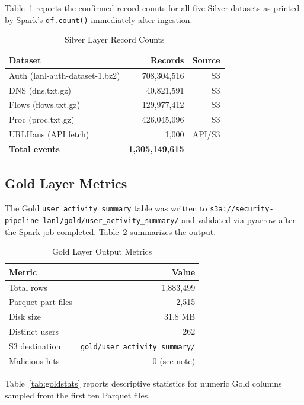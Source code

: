 \documentclass[conference]{IEEEtran}
\begin{document}
Table~\ref{tab:silver} reports the confirmed record counts for all five Silver datasets as printed by Spark's \texttt{df.count()} immediately after ingestion.

\begin{table}[htbp]
\caption{Silver Layer Record Counts}
\label{tab:silver}
\centering
\begin{tabular}{lrr}
\toprule
\textbf{Dataset} & \textbf{Records} & \textbf{Source} \\
\midrule
Auth (lanl-auth-dataset-1.bz2) & 708,304,516 & S3 \\
DNS (dns.txt.gz) & 40,821,591 & S3 \\
Flows (flows.txt.gz) & 129,977,412 & S3 \\
Proc (proc.txt.gz) & 426,045,096 & S3 \\
URLHaus (API fetch) & 1,000 & API/S3 \\
\midrule
\textbf{Total events} & \textbf{1,305,149,615} & \\
\bottomrule
\end{tabular}
\end{table}

\subsection{Gold Layer Metrics}

The Gold \texttt{user\_activity\_summary} table was written to \texttt{s3a://security-pipeline-lanl/gold/user\_activity\_summary/} and validated via pyarrow after the Spark job completed. Table~\ref{tab:gold} summarizes the output.

\begin{table}[htbp]
\caption{Gold Layer Output Metrics}
\label{tab:gold}
\centering
\begin{tabular}{lr}
\toprule
\textbf{Metric} & \textbf{Value} \\
\midrule
Total rows & 1,883,499 \\
Parquet part files & 2,515 \\
Disk size & 31.8 MB \\
Distinct users & 262 \\
S3 destination & \texttt{gold/user\_activity\_summary/} \\
Malicious hits & 0 (see note) \\
\bottomrule
\end{tabular}
\end{table}

Table~\ref{tab:goldstats} reports descriptive statistics for numeric Gold columns sampled from the first ten Parquet files.
\end{document}
